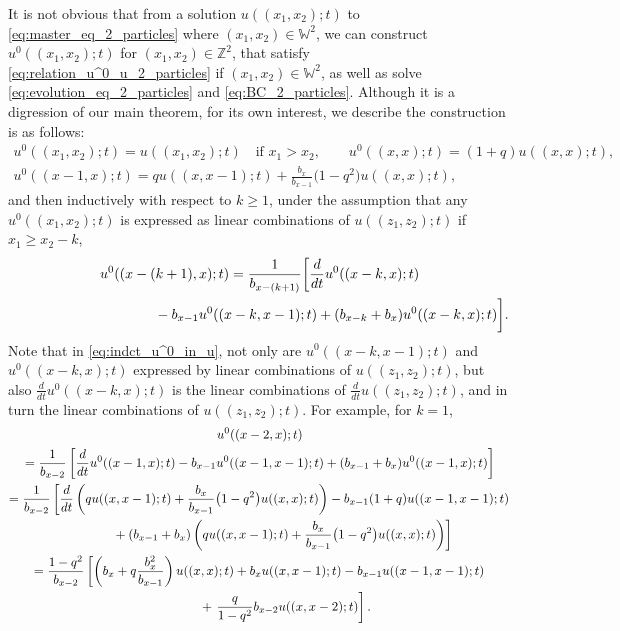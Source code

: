 \documentclass[pdftex]{sigma}
\numberwithin{equation}{section}
\newcommand{\intZ}{\mathbb{Z}}
\newcommand{\Weylchamber}{\mathbb{W}}
\begin{document}
\begin{Remark} \label{rmk:inverse_2pt}
 It is not obvious that from a solution $u((x_1, x_2); t)$ to \eqref{eq:master_eq_2_particles} where $(x_1, x_2) \in \Weylchamber^2$, we can construct $u^0((x_1, x_2); t)$ for $(x_1, x_2) \in \intZ^2$, that satisfy \eqref{eq:relation_u^0_u_2_particles} if $(x_1, x_2) \in \Weylchamber^2$, as well as solve \eqref{eq:evolution_eq_2_particles} and \eqref{eq:BC_2_particles}. Although it is a digression of our main theorem, for its own interest, we describe the construction is as follows:
\begin{gather*}
 u^0((x_1, x_2); t) = u((x_1, x_2); t) \quad \text{if $x_1 > x_2$}, \qquad u^0((x, x); t) = (1 + q) u((x, x); t), \\
 u^0((x - 1, x); t) = q u((x, x - 1); t) + \frac{b_x}{b_{x - 1}} \big(1 - q^2\big) u((x, x); t),
\end{gather*}
and then inductively with respect to $k \geq 1$, under the assumption that any $u^0((x_1, x_2); t)$ is expressed as linear combinations of $u((z_1, z_2); t)$ if $x_1 \geq x_2 - k$,
\begin{gather}
 u^0((x - (k + 1), x); t) =
 \frac{1}{b_{x - (k + 1)}} \bigg[ \frac{d}{dt} u^0((x - k, x); t) \nonumber\\
 \hphantom{u^0((x - (k + 1), x); t) = }{} - b_{x - 1} u^0((x - k, x - 1); t) + (b_{x - k} + b_x) u^0((x - k, x); t) \bigg].\label{eq:indct_u^0_in_u}
\end{gather}
Note that in \eqref{eq:indct_u^0_in_u}, not only are $u^0((x - k, x - 1); t)$ and $u^0((x - k, x); t)$ expressed by linear combinations of $u((z_1, z_2); t)$, but also $\frac{d}{dt} u^0((x - k, x); t)$ is the linear combinations of $\frac{d}{dt} u((z_1, z_2); t)$, and in turn the linear combinations of $u((z_1, z_2); t)$. For example, for $k = 1$,
\begin{gather*}
   u^0((x - 2, x); t) \\
 =   \frac{1}{b_{x - 2}} \left[ \frac{d}{dt} u^0((x - 1, x); t) - b_{x - 1} u^0((x - 1, x - 1); t) + (b_{x - 1} + b_x) u^0((x - 1, x); t) \right] \\
 =   \frac{1}{b_{x - 2}} \left[ \frac{d}{dt} \left( q u((x, x - 1); t) + \frac{b_x}{b_{x - 1}} \big(1 - q^2\big) u((x, x); t) \right) - b_{x - 1} (1 + q) u((x - 1, x - 1); t) \right. \\
  \hphantom{=\frac{1}{b_{x - 2}}} \left. \vphantom{\frac{d}{dt}} + (b_{x - 1} + b_x) \left( q u((x, x - 1); t) + \frac{b_x}{b_{x - 1}} \big(1 - q^2\big) u((x, x); t) \right) \right] \\
 =   \frac{1 - q^2}{b_{x - 2}} \left[ \left( b_x + q \frac{b^2_x}{b_{x - 1}} \right) u((x, x); t) + b_x u((x, x - 1); t) - b_{x - 1} u((x - 1, x - 1); t) \right. \\
  \hphantom{=\frac{1 - q^2}{b_{x - 2}}} + \left. \frac{q}{1 - q^2} b_{x - 2} u((x, x - 2); t) \right].
\end{gather*}
\end{Remark}
\end{document}
